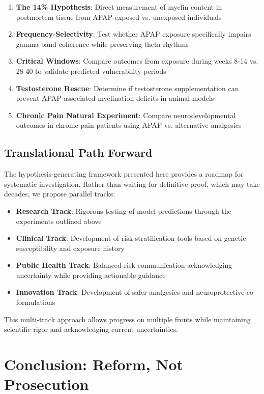 \documentclass[11pt]{article}
\let\oldsection\section
\renewcommand{\section}[1]{\oldsection{#1}\setlength{\leftskip}{0em}}
\let\oldsubsection\subsection
\renewcommand{\subsection}[1]{\oldsubsection{#1}\setlength{\leftskip}{0.75em}}
\begin{document}
\begin{enumerate}
\item \textbf{The 14\% Hypothesis}: Direct measurement of myelin content in postmortem tissue from APAP-exposed vs. unexposed individuals
\item \textbf{Frequency-Selectivity}: Test whether APAP exposure specifically impairs gamma-band coherence while preserving theta rhythms
\item \textbf{Critical Windows}: Compare outcomes from exposure during weeks 8-14 vs. 28-40 to validate predicted vulnerability periods
\item \textbf{Testosterone Rescue}: Determine if testosterone supplementation can prevent APAP-associated myelination deficits in animal models
\item \textbf{Chronic Pain Natural Experiment}: Compare neurodevelopmental outcomes in chronic pain patients using APAP vs. alternative analgesics
\end{enumerate}

\subsection{Translational Path Forward}

The hypothesis-generating framework presented here provides a roadmap for systematic investigation. Rather than waiting for definitive proof, which may take decades, we propose parallel tracks:

\begin{itemize}
\item \textbf{Research Track}: Rigorous testing of model predictions through the experiments outlined above
\item \textbf{Clinical Track}: Development of risk stratification tools based on genetic susceptibility and exposure history
\item \textbf{Public Health Track}: Balanced risk communication acknowledging uncertainty while providing actionable guidance
\item \textbf{Innovation Track}: Development of safer analgesics and neuroprotective co-formulations
\end{itemize}

This multi-track approach allows progress on multiple fronts while maintaining scientific rigor and acknowledging current uncertainties.

\section{Conclusion: Reform, Not Prosecution}
\end{document}
